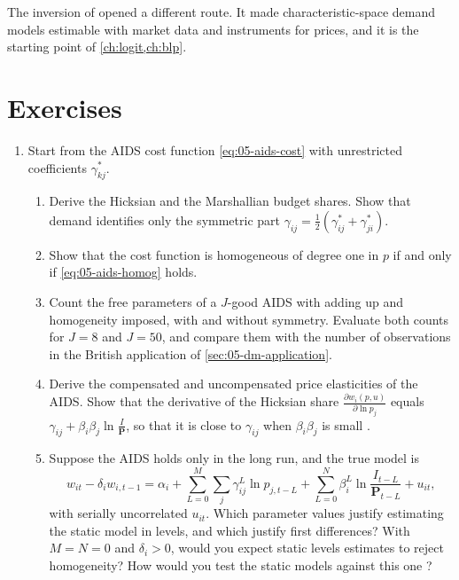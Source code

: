 The inversion of \citet{Berry1994} opened a different route. It made characteristic-space demand models estimable
with market data and instruments for prices, and it is the starting point of \cref{ch:logit,ch:blp}.

\section{Exercises}\label{sec:05-exercises}

\begin{enumerate}[label=\arabic*., leftmargin=*, itemsep=6pt]

\item Start from the AIDS cost function \eqref{eq:05-aids-cost} with unrestricted coefficients $\gamma^*_{kj}$.
\begin{enumerate}[label=(\alph*)]
  \item Derive the Hicksian and the Marshallian budget shares. Show that demand identifies only the symmetric part
  $\gamma_{ij} = \frac{1}{2}(\gamma^*_{ij} + \gamma^*_{ji})$.
  \item Show that the cost function is homogeneous of degree one in $p$ if and only if \eqref{eq:05-aids-homog}
  holds.
  \item Count the free parameters of a $J$-good AIDS with adding up and homogeneity imposed, with and without
  symmetry. Evaluate both counts for $J = 8$ and $J = 50$, and compare them with the number of observations in
  the British application of \cref{sec:05-dm-application}.
  \item Derive the compensated and uncompensated price elasticities of the AIDS. Show that the derivative of
  the Hicksian share $\frac{\partial w_i(p, u)}{\partial\ln p_j}$ equals $\gamma_{ij} + \beta_i\beta_j\ln\frac{I}{\mathbf{P}}$,
  so that it is close to $\gamma_{ij}$ when $\beta_i\beta_j$ is small \citep[Exercise~3.13]{DeatonMuellbauer1980b}.
  \item Suppose the AIDS holds only in the long run, and the true model is
  \begin{equation*}
    w_{it} - \delta_iw_{i,t-1} = \alpha_i + \sum_{L=0}^{M}\sum_j\gamma_{ij}^{L}\ln p_{j,t-L}
    + \sum_{L=0}^{N}\beta_i^{L}\ln\frac{I_{t-L}}{\mathbf{P}_{t-L}} + u_{it},
  \end{equation*}
  with serially uncorrelated $u_{it}$. Which parameter values justify estimating the static model in levels,
  and which justify first differences? With $M = N = 0$ and $\delta_i > 0$, would you expect static levels
  estimates to reject homogeneity? How would you test the static models against this one
  \citep[Exercise~3.14]{DeatonMuellbauer1980b}?
\end{enumerate}


\end{enumerate}
